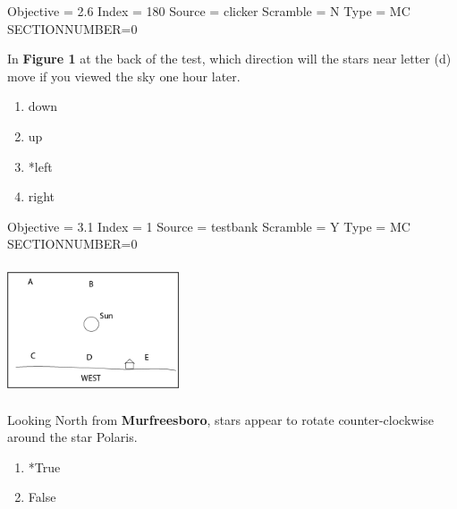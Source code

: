 \documentclass[11pt]{article}
\begin{document}
\begin{enumerate}
\begin{minipage}{\textwidth}
\begin{minipage}{\textwidth}
Objective = 2.6
Index = 180
Source = clicker
Scramble = N
Type = MC
SECTIONNUMBER=0
\end{minipage}
\end{minipage}
\vskip 0.20in

\begin{minipage}{\textwidth}
\begin{minipage}{3.0in}
\item In {\bf Figure 1} at the back of the test, which direction will the stars near letter (d) move if you viewed the sky one hour later.
\begin{multicols}{2}
\begin{enumerate} 
\setlength{\itemsep}{1pt} 
\setlength{\parskip}{0pt} 
\setlength{\parsep}{0pt}
\setlength{\multicolsep}{1pt} 
\item down
\item up
\item *left
\item right
\end{enumerate} 
\vfill 
\end{multicols}

Objective = 3.1
Index = 1
Source = testbank
Scramble = Y
Type = MC
SECTIONNUMBER=0
\end{minipage}
\hspace{0.5in}
\includegraphics[width=2in,height=1.5in,valign=c]{./images/sunset.png}
\end{minipage}
\vskip 0.20in

\begin{minipage}{\textwidth}
\begin{minipage}{\textwidth}
\item Looking North from {\bf Murfreesboro}, stars appear to rotate counter-clockwise around the star Polaris.
\begin{multicols}{3}
\begin{enumerate} 
\setlength{\itemsep}{1pt} 
\setlength{\parskip}{0pt} 
\setlength{\parsep}{0pt}
\setlength{\multicolsep}{1pt} 
\item *True
\item False
\end{enumerate} 
\vfill 
\end{multicols}


\end{minipage}
\end{minipage}
\end{enumerate}
\end{document}
